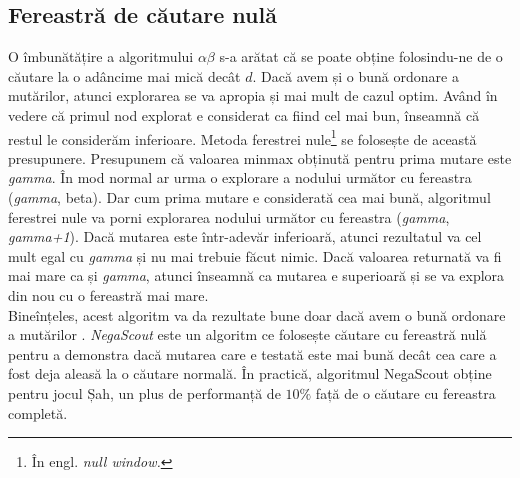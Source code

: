 \documentclass[12pt,twoside,a4paper,fleqn]{book}
\theoremstyle{definition}
\begin{document}
\subsection{Fereastră de căutare nulă}
O îmbunătățire a algoritmului $\alpha \beta$ s-a arătat că se poate obține folosindu-ne de o căutare la o adâncime mai mică decât $d$. Dacă avem și o bună ordonare a mutărilor, atunci explorarea se va apropia și mai mult de cazul optim. Având în vedere că primul nod explorat e considerat ca fiind cel mai bun, înseamnă că restul le considerăm inferioare. Metoda ferestrei nule\footnote{În engl. \emph{null window.}} se folosește de această presupunere. Presupunem că valoarea minmax obținută pentru prima mutare este \emph{gamma}. În mod normal ar urma o explorare a nodului următor cu fereastra (\emph{gamma}, beta). Dar cum prima mutare e considerată cea mai bună, algoritmul ferestrei nule va porni explorarea nodului următor cu fereastra (\emph{gamma}, \emph{gamma+1}). Dacă mutarea este într-adevăr inferioară, atunci rezultatul va cel mult egal cu \emph{gamma} și nu mai trebuie făcut nimic. Dacă valoarea returnată va fi mai mare ca și \emph{gamma}, atunci înseamnă ca mutarea e superioară și se va explora din nou cu o fereastră mai mare.\\
Bineînțeles, acest algoritm va da rezultate bune doar dacă avem o bună ordonare a mutărilor \cite{brokington}. \emph{NegaScout} este un algoritm ce folosește căutare cu fereastră nulă pentru a demonstra dacă mutarea care e testată este mai bună decât cea care a fost deja aleasă la o căutare normală. În practică, algoritmul NegaScout obține pentru jocul Șah, un plus de performanță de $10\%$ față de o căutare cu fereastra completă.
\end{document}
